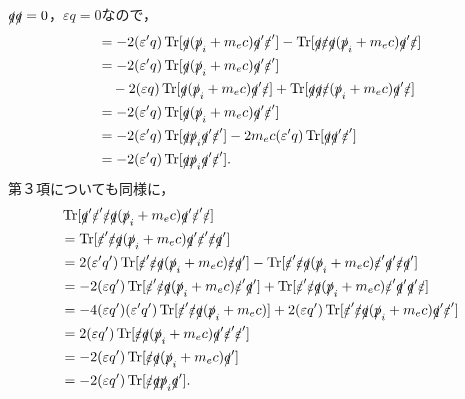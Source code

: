 $\slashed{q}\slashed{q}=0$，$\varepsilon q=0$なので，
\begin{align*}
  & = -2(\varepsilon'q)\operatorname{Tr} [\slashed{q}(\slashed{p}_i+m_ec)\slashed{q}'\slashed{\varepsilon}'] - \operatorname{Tr} [\slashed{q}\slashed{\varepsilon}\slashed{q}(\slashed{p}_i+m_ec)\slashed{q}'\slashed{\varepsilon}]\\
  & = -2(\varepsilon'q)\operatorname{Tr} [\slashed{q}(\slashed{p}_i+m_ec)\slashed{q}'\slashed{\varepsilon}'] \\
  & \quad -2(\varepsilon q)\operatorname{Tr} [\slashed{q}(\slashed{p}_i+m_ec)\slashed{q}'\slashed{\varepsilon}] + \operatorname{Tr} [\slashed{q}\slashed{q}\slashed{\varepsilon}(\slashed{p}_i+m_ec)\slashed{q}'\slashed{\varepsilon}]\\
  & = -2(\varepsilon'q)\operatorname{Tr} [\slashed{q}(\slashed{p}_i+m_ec)\slashed{q}'\slashed{\varepsilon}']\\
  & = -2(\varepsilon'q)\operatorname{Tr} [\slashed{q}\slashed{p}_i\slashed{q}'\slashed{\varepsilon}'] - 2m_ec(\varepsilon'q)\operatorname{Tr} [\slashed{q}\slashed{q}'\slashed{\varepsilon}']\\
  & = -2(\varepsilon'q)\operatorname{Tr} [\slashed{q}\slashed{p}_i\slashed{q}'\slashed{\varepsilon}'].
\end{align*}
第３項についても同様に，
\begin{align*}
  & \operatorname{Tr} [\slashed{q}'\slashed{\varepsilon}'\slashed{\varepsilon}\slashed{q}(\slashed{p}_i+m_ec)\slashed{q}'\slashed{\varepsilon}'\slashed{\varepsilon}]\\
  & = \operatorname{Tr} [\slashed{\varepsilon}'\slashed{\varepsilon}\slashed{q}(\slashed{p}_i+m_ec)\slashed{q}'\slashed{\varepsilon}'\slashed{\varepsilon}\slashed{q}']\\
  & = 2(\varepsilon'q')\operatorname{Tr} [\slashed{\varepsilon}'\slashed{\varepsilon}\slashed{q}(\slashed{p}_i+m_ec)\slashed{\varepsilon}\slashed{q}'] - \operatorname{Tr} [\slashed{\varepsilon}'\slashed{\varepsilon}\slashed{q}(\slashed{p}_i+m_ec)\slashed{\varepsilon}'\slashed{q}'\slashed{\varepsilon}\slashed{q}']\\
  & = -2(\varepsilon q')\operatorname{Tr} [\slashed{\varepsilon}'\slashed{\varepsilon}\slashed{q}(\slashed{p}_i+m_ec)\slashed{\varepsilon}'\slashed{q}'] + \operatorname{Tr} [\slashed{\varepsilon}'\slashed{\varepsilon}\slashed{q}(\slashed{p}_i+m_ec)\slashed{\varepsilon}'\slashed{q}'\slashed{q}'\slashed{\varepsilon}]\\
  & = -4(\varepsilon q')(\varepsilon'q')\operatorname{Tr} [\slashed{\varepsilon}'\slashed{\varepsilon}\slashed{q}(\slashed{p}_i+m_ec)] + 2(\varepsilon q')\operatorname{Tr} [\slashed{\varepsilon}'\slashed{\varepsilon}\slashed{q}(\slashed{p}_i+m_ec)\slashed{q}'\slashed{\varepsilon}']\\
  & = 2(\varepsilon q')\operatorname{Tr} [\slashed{\varepsilon}\slashed{q}(\slashed{p}_i+m_ec)\slashed{q}'\slashed{\varepsilon}'\slashed{\varepsilon}']\\
  & = -2(\varepsilon q')\operatorname{Tr} [\slashed{\varepsilon}\slashed{q}(\slashed{p}_i+m_ec)\slashed{q}']\\
  & = -2(\varepsilon q')\operatorname{Tr} [\slashed{\varepsilon}\slashed{q}\slashed{p}_i\slashed{q}'].
\end{align*}
